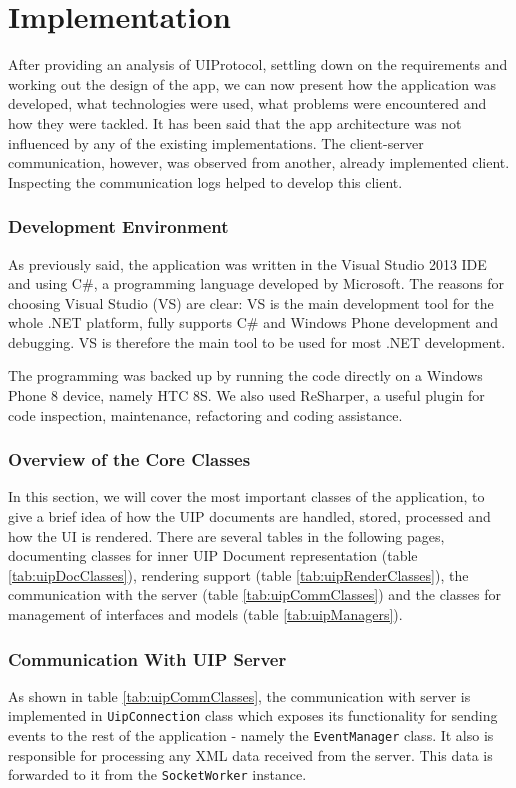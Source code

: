 \chapter{Implementation}
After providing an analysis of UIProtocol, settling down on the requirements and working out the design of the app, we can now present how the application was developed, what technologies were used, what problems were encountered and how they were tackled. It has been said that the app architecture was not influenced by any of the existing implementations. The client-server communication, however, was observed from another, already implemented client. Inspecting the communication logs helped to develop this client.

\subsection{Development Environment}
As previously said, the application was written in the Visual Studio 2013 IDE and using C\#, a programming language developed by Microsoft. The reasons for choosing Visual Studio (VS) are clear: VS is the main development tool for the whole .NET platform, fully supports C\# and Windows Phone development and debugging. VS is therefore the main tool to be used for most .NET development.

The programming was backed up by running the code directly on a Windows Phone 8 device, namely HTC 8S. We also used ReSharper, a useful plugin for code inspection, maintenance, refactoring and coding assistance.

\subsection{Overview of the Core Classes}
In this section, we will cover the most important classes of the application, to give a brief idea of how the UIP documents are handled, stored, processed and how the UI is rendered. There are several tables in the following pages, documenting classes for inner UIP Document representation (table \ref{tab:uipDocClasses}), rendering support (table \ref{tab:uipRenderClasses}), the communication with the server (table \ref{tab:uipCommClasses}) and the classes for management of interfaces and models (table \ref{tab:uipManagers}).






\subsection{Communication With UIP Server}
As shown in table \ref{tab:uipCommClasses}, the communication with server is implemented in \texttt{UipConnection} class which exposes its functionality for sending events to the rest of the application - namely the \texttt{EventManager} class. It also is responsible for processing any XML data received from the server. This data is forwarded to it from the \texttt{SocketWorker} instance.

